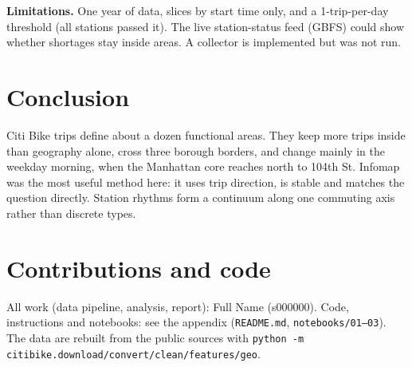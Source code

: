 \documentclass[10pt,a4paper]{article}
\begin{document}
\textbf{Limitations.} One year of data, slices by start time only, and a 1-trip-per-day threshold (all stations passed it).
The live station-status feed (GBFS) could show whether shortages stay inside areas.
A collector is implemented but was not run.

\section{Conclusion}
Citi Bike trips define about a dozen functional areas.
They keep more trips inside than geography alone, cross three borough borders, and change mainly in the weekday morning, when the Manhattan core reaches north to 104th St.
Infomap was the most useful method here: it uses trip direction, is stable and matches the question directly.
Station rhythms form a continuum along one commuting axis rather than discrete types.

\section*{Contributions and code}
All work (data pipeline, analysis, report): Full Name (s000000).
Code, instructions and notebooks: see the appendix (\texttt{README.md}, \texttt{notebooks/01--03}).
The data are rebuilt from the public sources with \texttt{python -m citibike.download/convert/clean/features/geo}.
\end{document}
